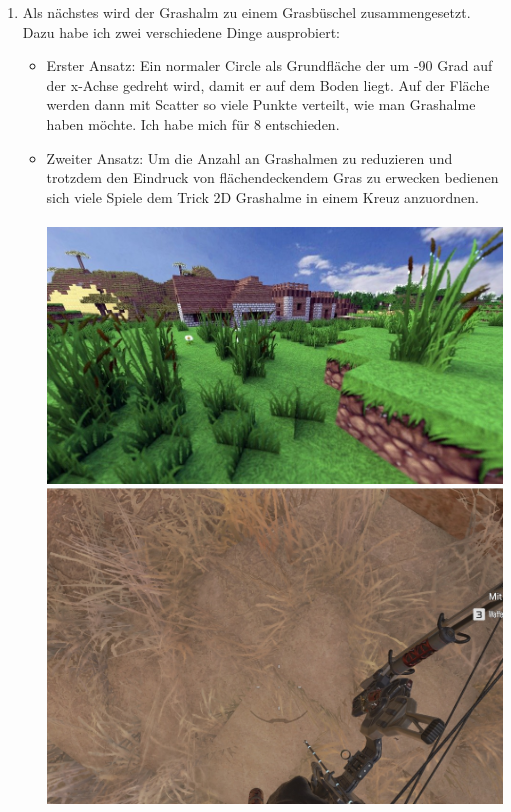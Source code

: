 \documentclass[paper=a4,fontsize=12pt,ngerman]{scrartcl}
\begin{document}
\begin{enumerate}
		\item Als nächstes wird der Grashalm zu einem Grasbüschel zusammengesetzt. Dazu habe ich zwei verschiedene Dinge ausprobiert:
		\begin{itemize}
			\item Erster Ansatz: Ein normaler Circle als Grundfläche der um -90 Grad auf der x-Achse gedreht wird, damit er auf dem Boden liegt. Auf der Fläche werden dann mit Scatter so viele Punkte verteilt, wie man Grashalme haben möchte. Ich habe mich für 8 entschieden. 
			\item Zweiter Ansatz: Um die Anzahl an Grashalmen zu reduzieren und trotzdem den Eindruck von flächendeckendem Gras zu erwecken bedienen sich viele Spiele dem Trick 2D Grashalme in einem Kreuz anzuordnen.\\ \\
			\includegraphics*[scale=0.23]{graphics/grass_cross_1.jpg}
			\includegraphics*[scale=0.19]{graphics/grass_cross_2.jpg}\\

\end{itemize}
\end{enumerate}
\end{document}
